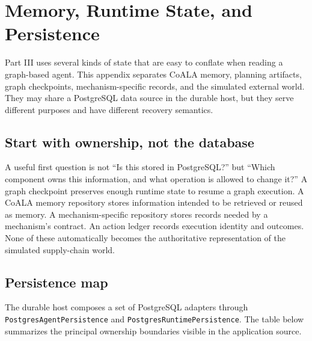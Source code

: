 \chapter{Memory, Runtime State, and Persistence}
\label{app:persistence}

Part III uses several kinds of state that are easy to conflate when reading a graph-based agent. This appendix separates CoALA memory, planning artifacts, graph checkpoints, mechanism-specific records, and the simulated external world. They may share a PostgreSQL data source in the durable host, but they serve different purposes and have different recovery semantics.

\section{Start with ownership, not the database}

A useful first question is not ``Is this stored in PostgreSQL?'' but ``Which component owns this information, and what operation is allowed to change it?'' A graph checkpoint preserves enough runtime state to resume a graph execution. A CoALA memory repository stores information intended to be retrieved or reused as memory. A mechanism-specific repository stores records needed by a mechanism's contract. An action ledger records execution identity and outcomes. None of these automatically becomes the authoritative representation of the simulated supply-chain world.

\section{Persistence map}

The durable host composes a set of PostgreSQL adapters through \texttt{PostgresAgentPersistence} and \texttt{PostgresRuntimePersistence}. The table below summarizes the principal ownership boundaries visible in the application source.

